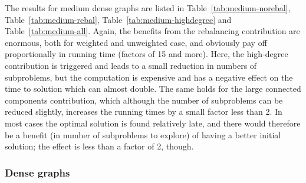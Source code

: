 \documentclass[a4paper,11pt]{article}
\begin{document}
The results for medium dense graphs are listed in
Table~\ref{tab:medium-norebal}, Table~\ref{tab:medium-rebal},
Table~\ref{tab:medium-highdegree} and Table~\ref{tab:medium-all}.
Again, the benefits from the rebalancing contribution are enormous,
both for weighted and unweighted case, and obviously pay off
proportionally in running time (factors of 15 and more). Here, the
high-degree contribution is triggered and leads to a small reduction
in numbers of subproblems, but the computation is expensive and has a
negative effect on the time to solution which can almost double. The
same holds for the large connected components contribution, which
although the number of subproblems can be reduced slightly, increases
the running times by a small factor less than 2. In most cases the
optimal solution is found relatively late, and there would therefore
be a benefit (in number of subproblems to explore) of having a better
initial solution; the effect is less than a factor of 2, though.

\subsubsection{Dense graphs}
\end{document}
